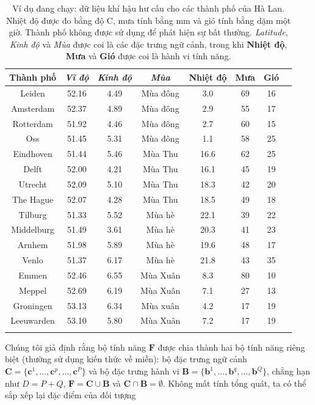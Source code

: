 \begin{table}[!htbp]
\caption{Ví dụ đang chạy: dữ liệu khí hậu hư cấu cho các thành phố của Hà Lan. Nhiệt độ được đo bằng độ C, mưa tính bằng mm và gió tính bằng dặm một giờ. Thành phố không được sử dụng để phát hiện sự bất thường. \emph{Latitude}, \emph{Kinh độ} và \emph{Mùa} được coi là các đặc trưng ngữ cảnh, trong khi \textbf{Nhiệt độ}, \textbf{Mưa} và \textbf{Gió} được coi là hành vi tính năng.}\label{tab:ExampleData}
\begin{center}
\begin{tabular}{cccccccc}
\toprule
Thành phố & \emph{Vĩ độ} & \emph{Kinh độ} & \emph{Mùa} & \textbf{Nhiệt độ} & \textbf{Mưa} & \textbf{Gió}\\
\midrule
Leiden & 52.16 & 4.49 & Mùa đông & 3.0 & 69 & 16\\
Amsterdam & 52.37 & 4.89 & Mùa đông & 2.9 & 55 & 17\\
Rotterdam & 51.92 & 4.46 & Mùa đông & 2.7 & 60 & 15\\
Oss & 51.45 & 5.31 & Mùa đông & 1.1 & 58 & 25\\
Eindhoven & 51.44 & 5.46 & Mùa Thu & 16.6 & 62 & 25\\
Delft & 52.00 & 4.21 & Mùa Thu & 16.1 & 45 & 19\\
Utrecht & 52.09 & 5.10 & Mùa Thu & 18.3 & 42 & 20\\
The Hague & 52.07 & 4.28 & Mùa Thu & 18.5 & 49 & 18\\
Tilburg & 51.33 & 5.52 & Mùa hè & 22.1 & 39 & 22\\
Middelburg & 51.49 & 3.61 & Mùa hè & 20.3 & 41 & 23\\
Arnhem & 51.98 & 5.89 & Mùa hè & 19.6 & 48 & 17\\
Venlo & 51.37 & 6.17 & Mùa hè & 21.8 & 43 & 35\\
Emmen & 52.46 & 6.55 & Mùa Xuân & 8.3 & 80 & 10\\
Meppel & 52.69 & 6.19 & Mùa Xuân & 7.1 & 27 & 13\\
Groningen & 53.13 & 6.34 & Mùa xuân & 4.2 & 17 & 19\\
Leeuwarden & 53.10 & 5.80 & Mùa Xuân & 7.2 & 17 & 19\\
\botrule
\end{tabular}
\end{center}
\end{table}Chúng tôi giả định rằng bộ tính năng $\mathbf{F}$ được chia thành hai bộ tính năng riêng biệt (thường sử dụng kiến ​​thức về miền): bộ đặc trưng ngữ cảnh $\mathbf{C} =\{\mathbf{c}^{1},...,\mathbf{c}^{p},\ldots,\mathbf{c}^{P}\}$ và bộ đặc trưng hành vi $\mathbf{B} =\{\mathbf{b}^{1},\ldots,\mathbf{b}^{q},\ldots,\mathbf{b}^{Q}\}$, chẳng hạn như $D=P+Q$, $\mathbf{F} = \mathbf{C} \cup \mathbf{B}$ và $\mathbf{C} \cap \mathbf{B} = \emptyset$. Không mất tính tổng quát, ta có thể sắp xếp lại đặc điểm của đối tượng
